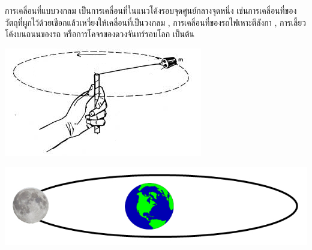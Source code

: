 การเคลื่อนที่แบบวงกลม  เป็นการเคลื่อนที่ในแนวโค้งรอบจุดศูนย์กลางจุดหนึ่ง   เช่นการเคลื่อนที่ของวัตถุที่ผูกไว้ด้วยเชือกแล้วเหวี่ยงให้เคลื่อนที่เป็นวงกลม   ,   การเคลื่อนที่ของรถไฟเหาะตีลังกา  ,   การเลี้ยวโค้งบนถนนของรถ   หรือการโคจรของดวงจันทร์รอบโลก  เป็นต้น
\begin{center}
\begin{minipage}{.45\textwidth}
\includegraphics[width=\textwidth]{content-10-1.jpg}
\end{minipage} \hfill
\begin{minipage}{.45\textwidth}
\includegraphics[width=\textwidth]{content-10-2.jpg}
\end{minipage}
\end{center}
